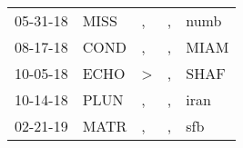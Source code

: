 \begin{supertabular}{lllll}
 05-31-18 &  MISS &             , &  , &  numb \\
 08-17-18 &  COND &             , &  , &  MIAM \\
 10-05-18 &  ECHO &  \textgreater &  , &  SHAF \\
 10-14-18 &  PLUN &             , &  , &  iran \\
 02-21-19 &  MATR &             , &  , &   sfb \\
\end{supertabular}
